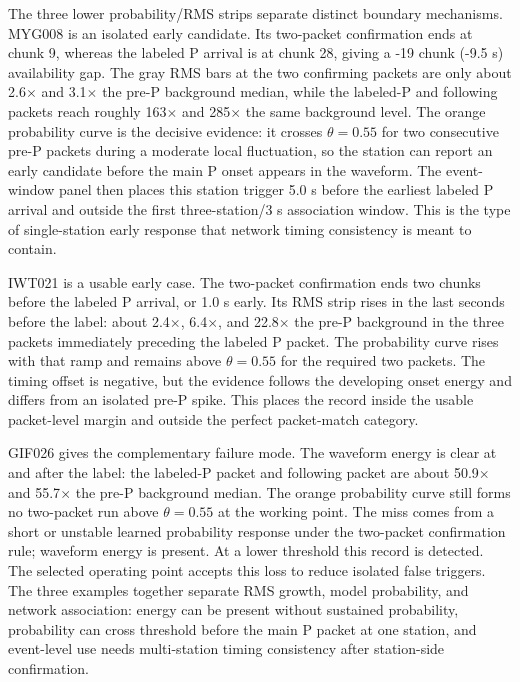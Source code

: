 \documentclass[journal]{IEEEtran}
\begin{document}
The three lower probability/RMS strips separate distinct boundary mechanisms. MYG008 is an isolated early candidate. Its two-packet confirmation ends at chunk 9, whereas the labeled P arrival is at chunk 28, giving a -19 chunk (-9.5 s) availability gap. The gray RMS bars at the two confirming packets are only about 2.6$\times$ and 3.1$\times$ the pre-P background median, while the labeled-P and following packets reach roughly 163$\times$ and 285$\times$ the same background level. The orange probability curve is the decisive evidence: it crosses $\theta=0.55$ for two consecutive pre-P packets during a moderate local fluctuation, so the station can report an early candidate before the main P onset appears in the waveform. The event-window panel then places this station trigger 5.0 s before the earliest labeled P arrival and outside the first three-station/3 s association window. This is the type of single-station early response that network timing consistency is meant to contain.

IWT021 is a usable early case. The two-packet confirmation ends two chunks before the labeled P arrival, or 1.0 s early. Its RMS strip rises in the last seconds before the label: about 2.4$\times$, 6.4$\times$, and 22.8$\times$ the pre-P background in the three packets immediately preceding the labeled P packet. The probability curve rises with that ramp and remains above $\theta=0.55$ for the required two packets. The timing offset is negative, but the evidence follows the developing onset energy and differs from an isolated pre-P spike. This places the record inside the usable packet-level margin and outside the perfect packet-match category.

GIF026 gives the complementary failure mode. The waveform energy is clear at and after the label: the labeled-P packet and following packet are about 50.9$\times$ and 55.7$\times$ the pre-P background median. The orange probability curve still forms no two-packet run above $\theta=0.55$ at the working point. The miss comes from a short or unstable learned probability response under the two-packet confirmation rule; waveform energy is present. At a lower threshold this record is detected. The selected operating point accepts this loss to reduce isolated false triggers. The three examples together separate RMS growth, model probability, and network association: energy can be present without sustained probability, probability can cross threshold before the main P packet at one station, and event-level use needs multi-station timing consistency after station-side confirmation.
\end{document}
